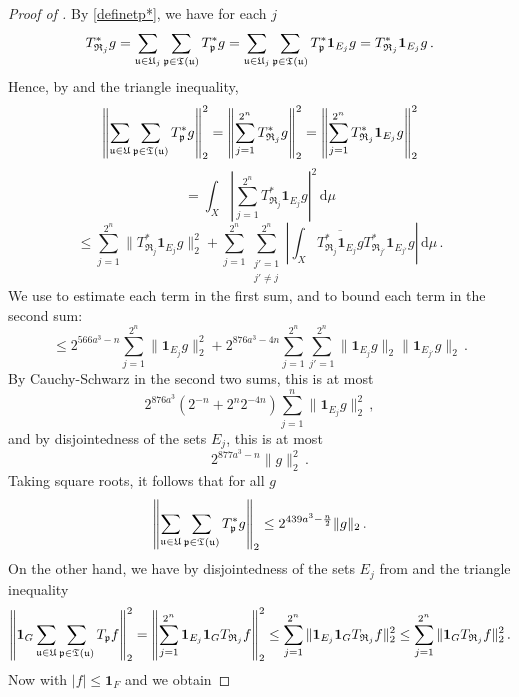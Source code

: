 \begin{proof}[Proof of ]
    \leanok
    By \eqref{definetp*}, we have for each $j$
    $$
        T_{\mathfrak{R}_j}^*g = \sum_{{\mathfrak u} \in {\mathfrak U}_j} \sum_{{\mathfrak p} \in {\mathfrak T}({\mathfrak u})} T_{{\mathfrak p}}^* g = \sum_{{\mathfrak u} \in {\mathfrak U}_j} \sum_{{\mathfrak p} \in {\mathfrak T}({\mathfrak u})} T_{{\mathfrak p}}^* \mathbf{1}_{E_j} g = T_{\mathfrak{R}_j}^* \mathbf{1}_{E_j} g\,.
    $$
    Hence, by  and the triangle inequality,
    $$
        \left\|\sum_{{\mathfrak u} \in {\mathfrak U}} \sum_{{\mathfrak p} \in {\mathfrak T}({\mathfrak u})} T^*_{{\mathfrak p}} g\right\|_2^2 = \left\|\sum_{j = 1}^{2^n} T^*_{\mathfrak{R}_{j}} g\right\|_2^2 = \left\|\sum_{j=1}^{2^n} T^*_{\mathfrak{R}_{j}} \mathbf{1}_{E_j} g\right\|_2^2
    $$
    $$
        = \int_X \left|\sum_{j=1}^{2^n} T^*_{\mathfrak{R}_{j}} \mathbf{1}_{E_j} g\right|^2 \, \mathrm{d}\mu
    $$
    $$
        \le \sum_{j=1}^{2^n} \|T_{\mathfrak{R}_j}^* \mathbf{1}_{E_j} g\|_2^2 + \sum_{j =1}^{2^n} \sum_{\substack{j' = 1\\j' \ne j}}^{2^n} \left| \int_X \overline{ T_{\mathfrak{R}_j}^* \mathbf{1}_{E_j} g} T_{\mathfrak{R}_{j'}}^* \mathbf{1}_{E_{j'}} g \right| \, \mathrm{d}\mu\,.
    $$
    We use  to estimate each term in the first sum, and  to bound each term in the second sum:
    $$
        \le 2^{566a^3-n} \sum_{j = 1}^{2^n} \|\mathbf{1}_{E_j} g\|_2^2 + 2^{876a^3-4n}\sum_{j=1}^{2^n}\sum_{j' = 1}^{2^n} \|\mathbf{1}_{E_j} g\|_2 \|\mathbf{1}_{E_{j'}}g\|_2\,.
    $$
    By Cauchy-Schwarz in the second two sums, this is at most
    $$
        2^{876a^3} (2^{-n} + 2^{n}2^{-4n}) \sum_{j = 1}^n \|\mathbf{1}_{E_j} g\|_2^2\,,
    $$
    and by disjointedness of the sets $E_j$, this is at most
    $$
        2^{877a^3 - n} \|g\|_2^2\,.
    $$
    Taking square roots, it follows that for all $g$
    \begin{equation}
        \label{eq-forest-bound-1}
        \left\|\sum_{{\mathfrak u} \in {\mathfrak U}} \sum_{{\mathfrak p} \in {\mathfrak T}({\mathfrak u})} T_{{\mathfrak p}}^* g\right\|_2 \le 2^{439a^3-\frac{n}{2}} \|g\|_2\,.
    \end{equation}
    On the other hand, we have by disjointedness of the sets $E_j$ from  and the triangle inequality
    $$
        \left\|\mathbf{1}_G \sum_{{\mathfrak u} \in {\mathfrak U}} \sum_{{\mathfrak p} \in {\mathfrak T}({\mathfrak u})} T_{{\mathfrak p}} f\right\|_2^2 = \left\|\sum_{j=1}^{2^n} \mathbf{1}_{E_j} \mathbf{1}_G T_{\mathfrak{R}_{j}} f\right\|_2^2 \le \sum_{j = 1}^{2^n} \|\mathbf{1}_{E_j} \mathbf{1}_G T_{\mathfrak{R}_{j}} f\|_2^2 \le \sum_{j = 1}^{2^n} \|\mathbf{1}_G T_{\mathfrak{R}_{j}} f\|_2^2\,.
    $$
    Now with $|f| \le \mathbf{1}_F$ and  we obtain

\end{proof}
